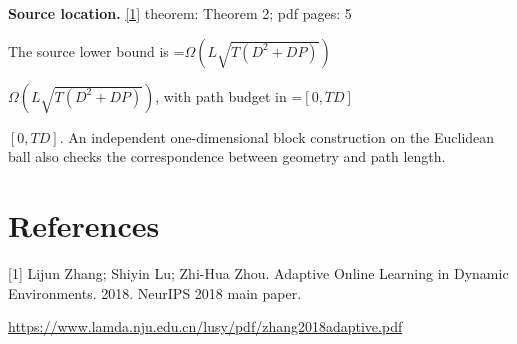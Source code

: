 \documentclass[10pt,a4paper]{article}
\newcommand{\AtlasMath}[1]{\par\begingroup\centering\setbox0=\hbox{$\displaystyle #1$}\ifdim\wd0>1.4\linewidth\typeout{ATLAS WIDE FORMULA: \the\wd0}\fi\ifdim\wd0>\linewidth\resizebox{\linewidth}{!}{\box0}\else\box0\fi\par\endgroup}
\newcommand{\AtlasInlineMath}[1]{\begingroup\setbox0=\hbox{$#1$}\ifdim\wd0>.4\linewidth\endgroup\AtlasMath{#1}\else\endgroup$#1$\fi}
\begin{document}
\textbf{Source location.} \href{https://www.lamda.nju.edu.cn/lusy/pdf/zhang2018adaptive.pdf}{[1]} theorem: Theorem 2; pdf pages: 5

The source lower bound is \AtlasInlineMath{\Omega(L\sqrt{T(D^2+DP)})}, with path budget in \AtlasInlineMath{[0,TD]}. An independent one-dimensional block construction on the Euclidean ball also checks the correspondence between geometry and path length.

\section{References}
[1] Lijun Zhang; Shiyin Lu; Zhi-Hua Zhou. Adaptive Online Learning in Dynamic Environments. 2018. NeurIPS 2018 main paper.

\url{https://www.lamda.nju.edu.cn/lusy/pdf/zhang2018adaptive.pdf}
\end{document}
